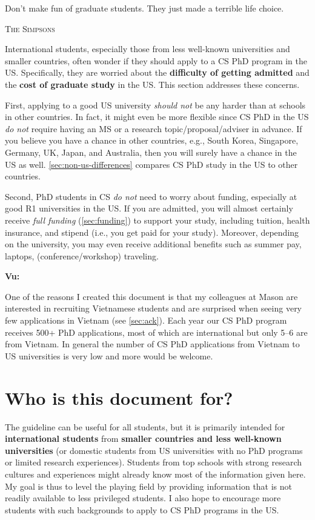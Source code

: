 \documentclass[oneside,11pt,dvipsnames]{book}
\newenvironment{commentbox}[1][]{
  \small
  \begin{mybox}
    {\small \textbf{#1}}
  }{
  \end{mybox}
}
\begin{document}
\epigraph{\vspace{-0.2in} Don't make fun of graduate students. They just made a terrible life choice.}{\textsc{The Simpsons}}

International students, especially those from less well-known universities and smaller countries, often wonder if they should apply to a CS PhD program in the US. Specifically, they are worried about the \textbf{difficulty of getting admitted} and the \textbf{cost of graduate study} in the US. This section addresses these concerns.


First, applying to a good US university \emph{should not} be any harder than at schools in other countries. In fact, it might even be more flexible since CS PhD in the US \emph{do not} require having an MS or a research topic/proposal/adviser in advance. If you believe you have a chance in other countries, e.g., South Korea, Singapore, Germany, UK, Japan, and Australia, then you will surely have a chance in the US as well. \autoref{sec:non-us-differences} compares CS PhD study in the US to other countries.


Second, PhD students in CS \emph{do not} need to worry about funding, especially at good R1
universities in the US. If you are admitted, you will almost certainly
receive \emph{full funding} (\autoref{sec:funding}) to support your study, including tuition,
health insurance, and stipend (i.e., you get paid for your study). Moreover, depending on the university,
you may even receive additional benefits such as summer pay, laptops, (conference/workshop) traveling.


\begin{commentbox}[Vu:]
  One of the reasons I created this document is that my colleagues at Mason are interested in recruiting Vietnamese students and are surprised when seeing very few applications in Vietnam (see \autoref{sec:ack}). Each year our CS PhD program receives 500+ PhD applications, most of which are international but only 5--6 are from Vietnam. In general the number of CS PhD applications from Vietnam to US universities is very low and more would be welcome.
\end{commentbox}


\section*{Who is this document for?}

The guideline can be useful for all students, but it is primarily intended for \textbf{international students} from \textbf{smaller countries and less well-known universities} (or domestic students from US universities with no PhD programs or limited research experiences). 
Students from top schools with strong research cultures and experiences might already know most of the information given here.
My goal is thus to level the playing field by providing information that is not readily available to less privileged students. 
I also hope to encourage more students with such backgrounds to apply to CS PhD programs in the US.
\end{document}
